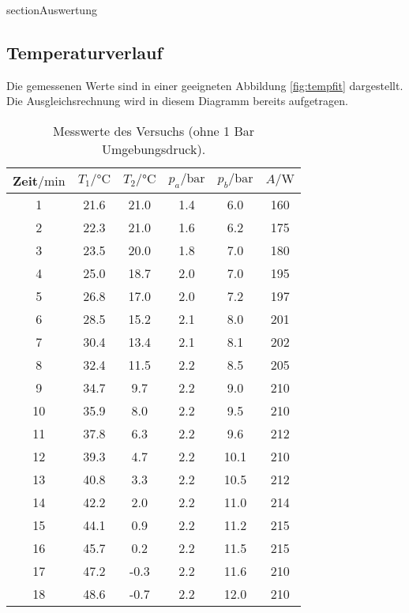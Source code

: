 section{Auswertung}
\label{sec:Auswertung}
\subsection{Temperaturverlauf}
Die gemessenen Werte sind in einer geeigneten Abbildung \ref{fig:tempfit} dargestellt.
Die Ausgleichsrechnung wird in diesem Diagramm bereits aufgetragen.
\begin{table}[H]
    \centering
    \caption{Messwerte des Versuchs (ohne 1 Bar Umgebungsdruck).}
    \label{tab:t1}
    \begin{tabular}{S[table-format=2.0] S S[table-format=+2.2] S S S[table-format=3.0]}
        \toprule
        {Zeit$/\si{\minute}$} & {$T_1/\si{\celsius}$} & {$T_2/\si{\celsius}$} & {$p_a/\si{\bar}$} & {$p_b/\si{\bar}$} & {$A/\si{\watt}$}\\
           & 21.6  & 21.0  & 1.4   & 6.0   & 160   \\
        2   & 22.3  & 21.0  & 1.6   & 6.2   & 175   \\
        3   & 23.5  & 20.0  & 1.8   & 7.0   & 180   \\
        4   & 25.0  & 18.7  & 2.0   & 7.0   & 195   \\
        5   & 26.8  & 17.0  & 2.0   & 7.2   & 197   \\
        6   & 28.5  & 15.2  & 2.1   & 8.0   & 201   \\
        7   & 30.4  & 13.4  & 2.1   & 8.1   & 202   \\
        8   & 32.4  & 11.5  & 2.2   & 8.5   & 205   \\
        9   & 34.7  & 9.7   & 2.2   & 9.0   & 210   \\
        10  & 35.9  & 8.0   & 2.2   & 9.5   & 210   \\
        11  & 37.8  & 6.3   & 2.2   & 9.6   & 212   \\
        12  & 39.3  & 4.7   & 2.2   & 10.1  & 210   \\
        13  & 40.8  & 3.3   & 2.2   & 10.5  & 212   \\
        14  & 42.2  & 2.0   & 2.2   & 11.0  & 214   \\
        15  & 44.1  & 0.9   & 2.2   & 11.2  & 215   \\
        16  & 45.7  & 0.2   & 2.2   & 11.5  & 215   \\
        17  & 47.2  & -0.3  & 2.2   & 11.6  & 210   \\
        18  & 48.6  & -0.7  & 2.2   & 12.0  & 210   \\
        \bottomrule
    \end{tabular}
\end{table}
